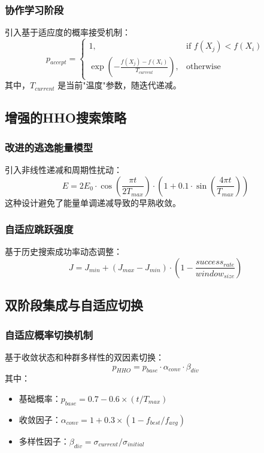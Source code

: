 \documentclass[conference]{IEEEtran}
\begin{document}
\subsubsection{协作学习阶段}
引入基于适应度的概率接受机制：
\begin{equation}
p_{accept} = \begin{cases}
1, & \text{if } f(X_j) < f(X_i) \\
\exp\left(-\frac{f(X_j) - f(X_i)}{T_{current}}\right), & \text{otherwise}
\end{cases}
\end{equation}
其中，$T_{current}$ 是当前"温度"参数，随迭代递减。

\subsection{增强的HHO搜索策略}
\subsubsection{改进的逃逸能量模型}
引入非线性递减和周期性扰动\cite{b15}：
\begin{equation}
E = 2E_0 \cdot \cos\left(\frac{\pi t}{2T_{max}}\right) \cdot \left(1 + 0.1 \cdot \sin\left(\frac{4\pi t}{T_{max}}\right)\right)
\end{equation}
这种设计避免了能量单调递减导致的早熟收敛。

\subsubsection{自适应跳跃强度}
基于历史搜索成功率动态调整\cite{b16}：
\begin{equation}
J = J_{min} + (J_{max} - J_{min}) \cdot \left(1 - \frac{success_{rate}}{window_{size}}\right)
\end{equation}

\subsection{双阶段集成与自适应切换}
\subsubsection{自适应概率切换机制}
基于收敛状态和种群多样性的双因素切换：
\begin{equation}
p_{HHO} = p_{base} \cdot \alpha_{conv} \cdot \beta_{div}
\end{equation}
其中：
\begin{itemize}
    \item 基础概率：$p_{base} = 0.7 - 0.6 \times (t/T_{max})$
    \item 收敛因子：$\alpha_{conv} = 1 + 0.3 \times (1 - f_{best}/f_{avg})$
    \item 多样性因子：$\beta_{div} = \sigma_{current}/\sigma_{initial}$
\end{itemize}
\end{document}
